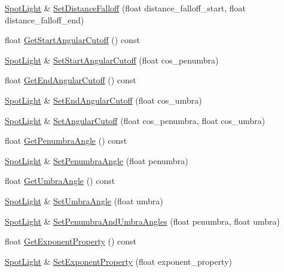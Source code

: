 \begin{DoxyCompactItemize}
\item 
\hyperlink{classmage_1_1_spot_light}{Spot\+Light} \& \hyperlink{classmage_1_1_spot_light_a7321dc4bef165fbaaf9cf4b5781bc00f}{Set\+Distance\+Falloff} (float distance\+\_\+falloff\+\_\+start, float distance\+\_\+falloff\+\_\+end)
\item 
float \hyperlink{classmage_1_1_spot_light_af91cd33b82eb12163ae8b4e9e459ad0c}{Get\+Start\+Angular\+Cutoff} () const
\item 
\hyperlink{classmage_1_1_spot_light}{Spot\+Light} \& \hyperlink{classmage_1_1_spot_light_a25b74af1ac97d62e362783e52549faa4}{Set\+Start\+Angular\+Cutoff} (float cos\+\_\+penumbra)
\item 
float \hyperlink{classmage_1_1_spot_light_a76b4bbc6b9f7b3f80e3ab664d12c4c11}{Get\+End\+Angular\+Cutoff} () const
\item 
\hyperlink{classmage_1_1_spot_light}{Spot\+Light} \& \hyperlink{classmage_1_1_spot_light_aba53e80e84049487484d0626eab93107}{Set\+End\+Angular\+Cutoff} (float cos\+\_\+umbra)
\item 
\hyperlink{classmage_1_1_spot_light}{Spot\+Light} \& \hyperlink{classmage_1_1_spot_light_a1932b3918fbd64096bd79bf80ac36e4f}{Set\+Angular\+Cutoff} (float cos\+\_\+penumbra, float cos\+\_\+umbra)
\item 
float \hyperlink{classmage_1_1_spot_light_a4945555b7570f48c7ffa505b60b6b8cc}{Get\+Penumbra\+Angle} () const
\item 
\hyperlink{classmage_1_1_spot_light}{Spot\+Light} \& \hyperlink{classmage_1_1_spot_light_a3420b7aac23776ff70ea6772db0751ef}{Set\+Penumbra\+Angle} (float penumbra)
\item 
float \hyperlink{classmage_1_1_spot_light_ab4d85fd032083e82f711596a8b075d02}{Get\+Umbra\+Angle} () const
\item 
\hyperlink{classmage_1_1_spot_light}{Spot\+Light} \& \hyperlink{classmage_1_1_spot_light_ac2d231f344d3070e3e7127a4c2da99d0}{Set\+Umbra\+Angle} (float umbra)
\item 
\hyperlink{classmage_1_1_spot_light}{Spot\+Light} \& \hyperlink{classmage_1_1_spot_light_a47869866b30e98e9f6af59905d127cc9}{Set\+Penumbra\+And\+Umbra\+Angles} (float penumbra, float umbra)
\item 
float \hyperlink{classmage_1_1_spot_light_aaff34ca166a8a129f461579869803aaa}{Get\+Exponent\+Property} () const
\item 
\hyperlink{classmage_1_1_spot_light}{Spot\+Light} \& \hyperlink{classmage_1_1_spot_light_a5a53acd29a7796a16459284dc24b9044}{Set\+Exponent\+Property} (float exponent\+\_\+property)
\end{DoxyCompactItemize}
